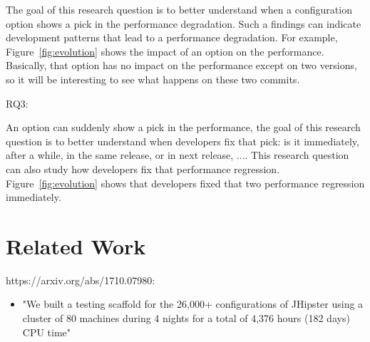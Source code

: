 \documentclass[smallextended]{svjour3}       %
\begin{document}
The goal of this research question is to better understand when a configuration option shows a pick in the performance degradation. Such a findings can indicate development patterns that lead to a performance degradation. For example, Figure~\ref{fig:evolution} shows the impact of an option on the performance. Basically, that option has no impact on the performance except on two versions, so it will be interesting to see what happens on these two commits. 

RQ3: \RQIII

An option can suddenly show a pick in the performance, the goal of this research question is to better understand when developers fix that pick: is it immediately, after a while, in the same release, or in next release, .... This research question can also study how developers fix that performance regression. Figure~\ref{fig:evolution} shows that developers fixed that two performance regression immediately.   


\section{Related Work}

https://arxiv.org/abs/1710.07980:
\begin{itemize}
    \item "We built a testing scaffold for the 26,000+ configurations of JHipster using a cluster of 80 machines during 4 nights for a total of 4,376 hours (182 days) CPU time"
\end{itemize}





\end{document}
